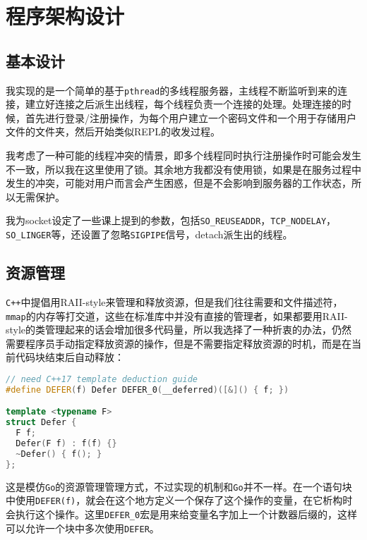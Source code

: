 \documentclass[12pt, UTF8]{article}
\begin{document}
\section{程序架构设计}

\subsection{基本设计}

我实现的是一个简单的基于\lstinline|pthread|的多线程服务器，主线程不断监听到来的连接，建立好连接之后派生出线程，每个线程负责一个连接的处理。处理连接的时候，首先进行登录/注册操作，为每个用户建立一个密码文件和一个用于存储用户文件的文件夹，然后开始类似REPL的收发过程。

我考虑了一种可能的线程冲突的情景，即多个线程同时执行注册操作时可能会发生不一致，所以我在这里使用了锁。其余地方我都没有使用锁，如果是在服务过程中发生的冲突，可能对用户而言会产生困惑，但是不会影响到服务器的工作状态，所以无需保护。

我为socket设定了一些课上提到的参数，包括\lstinline|SO_REUSEADDR|，\lstinline|TCP_NODELAY|，\lstinline|SO_LINGER|等，还设置了忽略\lstinline|SIGPIPE|信号，detach派生出的线程。

\subsection{资源管理}

\lstinline|C++|中提倡用RAII-style来管理和释放资源，但是我们往往需要和文件描述符，\lstinline|mmap|的内存等打交道，这些在标准库中并没有直接的管理者，如果都要用RAII-style的类管理起来的话会增加很多代码量，所以我选择了一种折衷的办法，仍然需要程序员手动指定释放资源的操作，但是不需要指定释放资源的时机，而是在当前代码块结束后自动释放：

\begin{lstlisting}[language = C++, ndkeywords = { DEFER }]
// need C++17 template deduction guide
#define DEFER(f) Defer DEFER_0(__deferred)([&]() { f; })

template <typename F>
struct Defer {
  F f;
  Defer(F f) : f(f) {}
  ~Defer() { f(); }
};
\end{lstlisting}

这是模仿\lstinline|Go|的资源管理管理方式，不过实现的机制和\lstinline|Go|并不一样。在一个语句块中使用\lstinline|DEFER(f)|，就会在这个地方定义一个保存了这个操作的变量，在它析构时会执行这个操作。这里\lstinline|DEFER_0|宏是用来给变量名字加上一个计数器后缀的，这样可以允许一个块中多次使用\lstinline|DEFER|。
\end{document}
